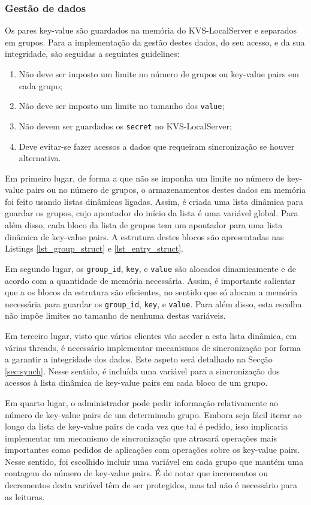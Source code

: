 \subsubsection{Gestão de dados}\label{sec:gestao_dados}
Os pares key-value são guardados na memória do KVS-LocalServer e separados em grupos. Para a implementação da gestão destes dados, do seu acesso, e da sua integridade, são seguidas a seguintes guidelines:
\begin{enumerate}[noitemsep]
    \item Não deve ser imposto um limite no número de grupos ou key-value pairs em cada grupo;
    \item Não deve ser imposto um limite no tamanho dos \texttt{value};
    \item Não devem ser guardados os \texttt{secret} no KVS-LocalServer;
    \item Deve evitar-se fazer acessos a dados que requeiram sincronização se houver alternativa.
\end{enumerate}

Em primeiro lugar, de forma a que não se imponha um limite no número de key-value pairs ou no número de grupos, o armazenamentos destes dados em memória foi feito usando listas dinâmicas ligadas. Assim, é criada uma lista dinâmica para guardar os grupos, cujo apontador do início da lista é uma variável global. Para além disso, cada bloco da lista de grupos tem um apontador para uma lista dinâmica de key-value pairs. A estrutura destes blocos são apresentadas nas Listings \ref{lst_group_struct} e \ref{lst_entry_struct}.

Em segundo lugar, os \texttt{group\_id}, \texttt{key}, e \texttt{value} são alocados dinamicamente e de acordo com a quantidade de memória necessária. Assim, é importante salientar que a os blocos da estrutura são eficientes, no sentido que só alocam a memória necessária para guardar os  \texttt{group\_id}, \texttt{key}, e \texttt{value}. Para além disso, esta escolha não impõe limites no tamanho de nenhuma destas variáveis. 

Em terceiro lugar, visto que vários clientes vão aceder a esta lista dinâmica, em várias threads, é necessário implementar mecanismos de sincronização por forma a garantir a integridade dos dados. Este aspeto será detalhado na Secção \ref{sec:synch}. Nesse sentido, é incluída uma variável para a sincronização dos acessos à lista dinâmica de key-value pairs em cada bloco de um grupo.

Em quarto lugar, o administrador pode pedir informação relativamente ao número de key-value pairs de um determinado grupo. Embora seja fácil iterar ao longo da lista de key-value pairs de cada vez que tal é pedido, isso implicaria implementar um mecanismo de sincronização que atrasará operações mais importantes como pedidos de aplicações com operações sobre os key-value pairs. Nesse sentido, foi escolhido incluir uma variável em cada grupo que mantém uma contagem do número de key-value pairs. É de notar que incrementos ou decrementos desta variável têm de ser protegidos, mas tal não é necessário para as leituras. 

